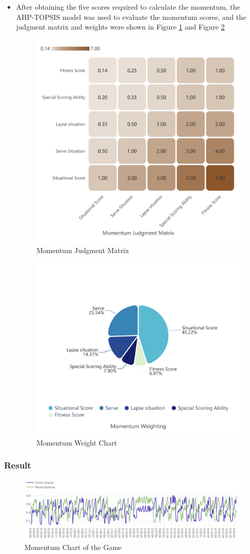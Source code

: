 \begin{itemize}
\item After obtaining the five scores required to calculate the momentum, the AHP-TOPSIS model was used to evaluate the momentum scores, and the judgment matrix and weights were shown in Figure \ref{fig:M1} and Figure \ref{fig:M2}
\begin{figure}[bt!]
    \centering
    \includegraphics[width=0.5\linewidth]{figure/势头.jpg}
    \caption{\centering Momentum Judgment Matrix}
    \label{fig:M1}
\end{figure}
\begin{figure}[bt!]
    \centering
    \includegraphics[width=0.75\linewidth]{figure/势头2.jpg}
    \caption{\centering Momentum Weight Chart}
    \label{fig:M2}
\end{figure}
\end{itemize}

\subsubsection{Result}
\begin{figure}[bt!]
    \centering
    \includegraphics[width=1\linewidth]{figure/经典场.png}
    \caption{\centering Momentum Chart of the Game}
    \label{fig:M3}
\end{figure}

